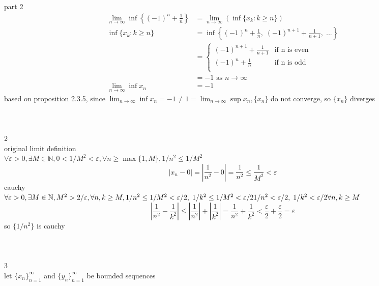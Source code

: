 \documentclass[12pt, border = 4pt, multi]{article} %
\begin{document}
\\
\\
part 2
\begin{align*}
\lim_{n \rightarrow \infty} \inf\left\{(-1) ^ n + \frac{1}{n}\right\} &= \lim_{n \rightarrow \infty}(\inf\{x_k: k \geq n\})\\
\inf\{x_k: k \geq n\} &= \inf\left\{(-1) ^ n + \frac{1}{n},\;(-1) ^ {n + 1} + \frac{1}{n + 1},\;...\right\}\\
&=
\begin{cases}
(-1) ^ {n + 1} + \frac{1}{n + 1} & \text{if n is even}\\
(-1) ^ n + \frac{1}{n} & \text{if n is odd}\\
\end{cases}\\
&= -1 \text{ as } n \rightarrow \infty\\
\lim_{n \rightarrow \infty} \inf x_n &= -1
\end{align*}
based on proposition 2.3.5, since $\lim_{n \rightarrow \infty} \inf x_n = -1 \not= 1 = \lim_{n \rightarrow \infty} \sup x_n, \{x_n\}$ do not converge, so $\{x_n\}$ diverges\\
\\
\\
\\
2\\
original limit definition\\
$\forall \varepsilon > 0, \exists M \in \mathbb{N}, 0 < 1 / M ^ 2 < \varepsilon, \forall n \geq \max\{1, M\}, 1 / n ^ 2 \leq 1 / M ^ 2$
\[|x_n - 0| = \left|\frac{1}{n ^ 2}- 0\right| = \frac{1}{n ^ 2} \leq \frac{1}{M ^ 2} < \varepsilon\]
cauchy\\
$\forall \varepsilon > 0, \exists M \in \mathbb{N}, M ^ 2 > 2 / \varepsilon, \forall n, k \geq M, 1 / n ^ 2 \leq 1 / M ^ 2 < \varepsilon / 2,\; 1 / k ^ 2 \leq 1 / M ^ 2 < \varepsilon / 2\\
1 / n ^ 2 < \varepsilon / 2,\;1 / k ^ 2 < \varepsilon / 2\\
\forall n, k \geq M$
\[\left|\frac{1}{n ^ 2} - \frac{1}{k ^ 2}\right| \leq \left|\frac{1}{n ^ 2}\right| + \left|\frac{1}{k ^ 2}\right| = \frac{1}{n ^ 2} + \frac{1}{k ^ 2} < \frac{\varepsilon}{2} + \frac{\varepsilon}{2} = \varepsilon\]
so $\{1 / n ^ 2\}$ is cauchy\\
\\
\\
\\
3\\
let $\{x_n\}_{n = 1} ^ {\infty}$ and $\{y_n\}_{n = 1} ^ {\infty}$ be bounded sequences\\
\end{document}
